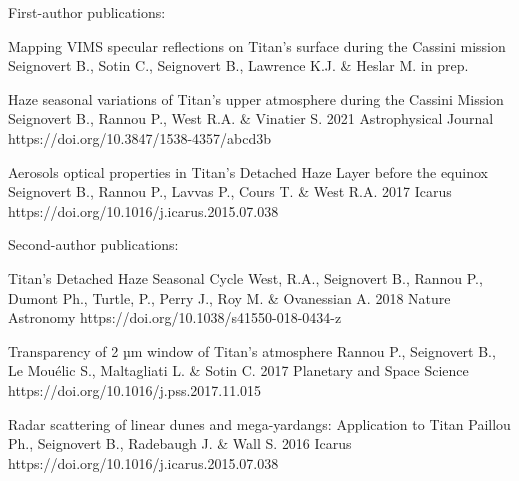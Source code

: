 
\begin{cvpublications}{First-author publications:}

	{Mapping VIMS specular reflections on Titan's surface during the Cassini mission}
	{Seignovert B., Sotin C., Seignovert B., Lawrence K.J. \& Heslar M.}
	{in prep.}
    {}
    {}

	{Haze seasonal variations of Titan's upper atmosphere during the Cassini Mission}
	{Seignovert B., Rannou P., West R.A. \& Vinatier S.}
	{2021}
    {Astrophysical Journal}
	{https://doi.org/10.3847/1538-4357/abcd3b}

	{Aerosols optical properties in Titan's Detached Haze Layer before the equinox}
	{Seignovert B., Rannou P., Lavvas P., Cours T. \& West R.A.}
	{2017}
	{Icarus}
	{https://doi.org/10.1016/j.icarus.2015.07.038}

\end{cvpublications}

\begin{cvpublications}{Second-author publications:}


	{Titan's Detached Haze Seasonal Cycle}
	{West, R.A., Seignovert B., Rannou P., Dumont Ph., Turtle,  P., Perry J., Roy M. \& Ovanessian A.}
	{2018}
    {Nature Astronomy}
    {https://doi.org/10.1038/s41550-018-0434-z}

	{Transparency of 2 µm window of Titan’s atmosphere}
	{Rannou P., Seignovert B., Le Mouélic S., Maltagliati L. \& Sotin C.}
	{2017}
	{Planetary and Space Science}
	{https://doi.org/10.1016/j.pss.2017.11.015}

	{Radar scattering of linear dunes and mega-yardangs: Application to Titan}
	{Paillou Ph., Seignovert B., Radebaugh J. \& Wall S.}
	{2016}
	{Icarus}
	{https://doi.org/10.1016/j.icarus.2015.07.038}

\end{cvpublications}

